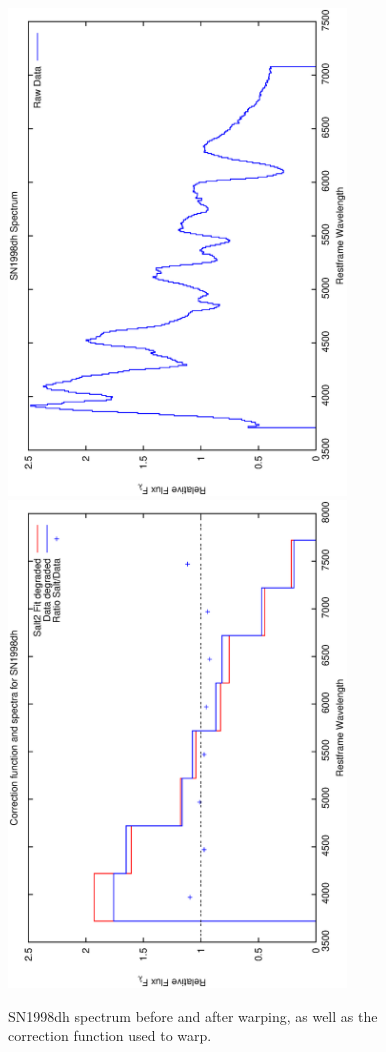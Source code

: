 \clearpage

\begin{figure}[p]
\centering
\includegraphics[angle=-90,width=0.8\textwidth]{./figures/spectrabeforeafter/SN1998dh_handpicked_v001_v027_before_after_spectra.ps}
\hfill
\includegraphics[angle=-90,width=0.8\textwidth]{./figures/corrections/SN1998dh_v001_correction.ps}
\hfill
\caption{SN1998dh spectrum before and after warping, as well as the correction function used to warp.}
\label{fig:SN1998dhfour1}
\end{figure}

